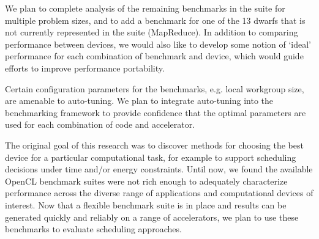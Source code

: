 \documentclass[../document.tex]{subfiles}
\begin{document}
\label{sec:future_work}

We plan to complete analysis of the remaining benchmarks in the suite for multiple problem sizes, and to add a benchmark for one of the 13 dwarfs that is not currently represented in the suite (MapReduce).
In addition to comparing performance between devices, we would also like to develop some notion of `ideal' performance for each combination of benchmark and device, which would guide efforts to improve performance portability.

Certain configuration parameters for the benchmarks, e.g. local workgroup size, are amenable to auto-tuning.
We plan to integrate auto-tuning into the benchmarking framework to provide confidence that the optimal parameters are used for each combination of code and accelerator.

The original goal of this research was to discover methods for choosing the best device for a particular computational task, for example to support scheduling decisions under time and/or energy constraints.
Until now, we found the available OpenCL benchmark suites were not rich enough to adequately characterize performance across the diverse range of applications and computational devices of interest.
Now that a flexible benchmark suite is in place and results can be generated quickly and reliably on a range of accelerators, we plan to use these benchmarks to evaluate scheduling approaches.
\end{document}

